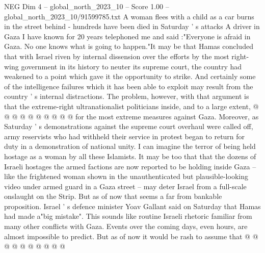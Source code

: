 \begin{textsample}{NEG Dim 4 – global\_north\_2023\_10 – Score 1.00 – global\_north\_2023\_10/91599785.txt}
A woman flees with a child as a car burns in the street behind - hundreds have been died in Saturday ' s attacks A driver in Gaza I have known for 20 years telephoned me and said :"Everyone is afraid in Gaza.
No one knows what is going to happen."It may be that Hamas concluded that with Israel riven by internal dissension over the efforts by the most right-wing government in its history to neuter its supreme court, the country had weakened to a point which gave it the opportunity to strike.
And certainly some of the intelligence failures which it has been able to exploit may result from the country ' s internal distractions.
The problem, however, with that argument is that the extreme-right ultranationalist politicians inside, and to a large extent, @ @ @ @ @ @ @ @ @ @ for the most extreme measures against Gaza.
Moreover, as Saturday ' s demonstrations against the supreme court overhaul were called off, army reservists who had withheld their service in protest began to return for duty in a demonstration of national unity.
I can imagine the terror of being held hostage as a woman by all these Islamists.
It may be too that that the dozens of Israeli hostages the armed factions are now reported to be holding inside Gaza -- like the frightened woman shown in the unauthenticated but plausible-looking video under armed guard in a Gaza street -- may deter Israel from a full-scale onslaught on the Strip.
But as of now that seems a far from bankable proposition.
Israel ' s defence minister Yoav Gallant said on Saturday that Hamas had made a"big mistake".
This sounds like routine Israeli rhetoric familiar from many other conflicts with Gaza.
Events over the coming days, even hours, are almost impossible to predict.
But as of now it would be rash to assume that @ @ @ @ @ @ @ @ @ @

\end{textsample}
